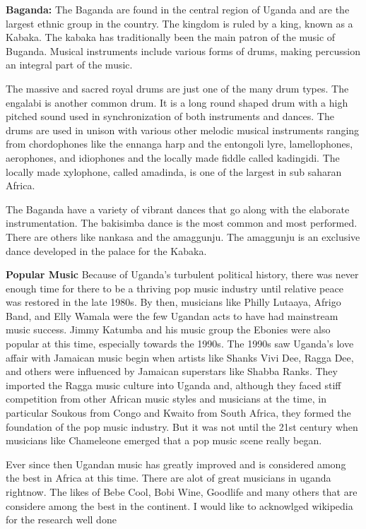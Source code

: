 \documentclass{article}
\begin{document}
\textbf{Baganda:}
The Baganda are found in the central region of Uganda and are the largest ethnic group in the country. The kingdom is ruled by a king, known as a Kabaka. The kabaka has traditionally been the main patron of the music of Buganda. Musical instruments include various forms of drums, making percussion an integral part of the music. 

The massive and sacred royal drums are just one of the many drum types. The engalabi is another common drum. It is a long round shaped drum  with a high pitched sound used in synchronization of both instruments and dances.  The drums are used in unison with various other melodic musical instruments ranging from chordophones like the ennanga harp and the entongoli lyre, lamellophones, aerophones, and idiophones and the locally made fiddle called kadingidi. The locally made xylophone, called amadinda, is one of the largest in sub saharan Africa. 

The Baganda have a variety of vibrant dances that go along with the elaborate instrumentation. The bakisimba dance is the most common and most performed. There are others like nankasa and the amaggunju. The amaggunju is an exclusive dance developed in the palace for the Kabaka.

\textbf{Popular Music}
 Because of Uganda's turbulent political history, there was never enough time for there to be a thriving pop music industry until relative peace was restored in the late 1980s. By then, musicians like Philly Lutaaya, Afrigo Band, and Elly Wamala were the few Ugandan acts to have had mainstream music success. Jimmy Katumba and his music group the Ebonies were also popular at this time, especially towards the 1990s.
The 1990s saw Uganda's love affair with Jamaican music begin when artists like Shanks Vivi Dee, Ragga Dee, and others were influenced by Jamaican superstars like Shabba Ranks. They imported the Ragga music culture into Uganda and, although they faced stiff competition from other African music styles and musicians at the time, in particular Soukous from Congo and Kwaito from South Africa, they formed the foundation of the pop music industry. But it was not until the 21st century when musicians like Chameleone emerged that a pop music scene really began.

Ever since then Ugandan music has greatly improved and is considered among the best in Africa at this time. There are alot of great musicians in uganda rightnow. The likes of Bebe Cool, Bobi Wine, Goodlife and many others that are considere among the best in the continent. 
I would like to acknowlged wikipedia for the research well done 
\end{document}

